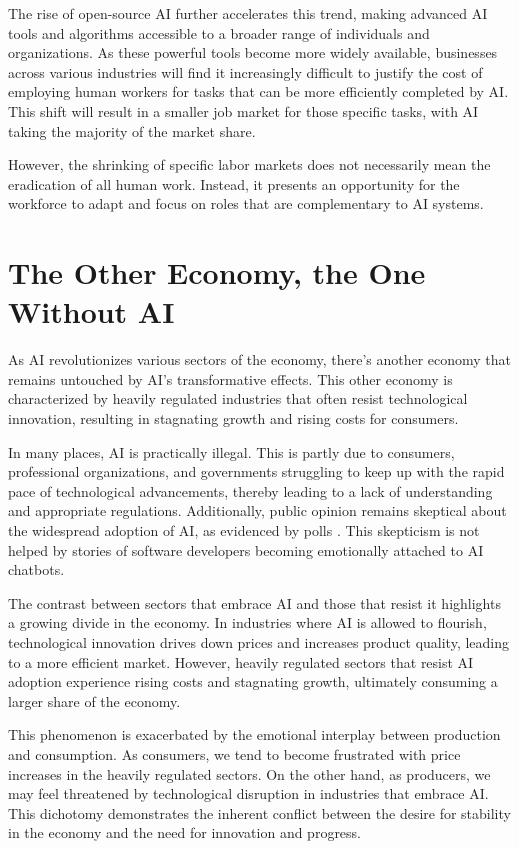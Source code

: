 The rise of open-source AI further accelerates this trend, making advanced AI tools and algorithms accessible to a broader range of individuals and organizations. As these powerful tools become more widely available, businesses across various industries will find it increasingly difficult to justify the cost of employing human workers for tasks that can be more efficiently completed by AI. This shift will result in a smaller job market for those specific tasks, with AI taking the majority of the market share.

However, the shrinking of specific labor markets does not necessarily mean the eradication of all human work. Instead, it presents an opportunity for the workforce to adapt and focus on roles that are complementary to AI systems.

\section{The Other Economy, the One Without AI}

As AI revolutionizes various sectors of the economy, there’s another economy that remains untouched by AI’s transformative effects. This other economy is characterized by heavily regulated industries that often resist technological innovation, resulting in stagnating growth and rising costs for consumers.

In many places, AI is practically illegal. This is partly due to consumers, professional organizations, and governments struggling to keep up with the rapid pace of technological advancements, thereby leading to a lack of understanding and appropriate regulations. Additionally, public opinion remains skeptical about the widespread adoption of AI, as evidenced by polls . This skepticism is not helped by stories of software developers becoming emotionally attached to AI chatbots.

The contrast between sectors that embrace AI and those that resist it highlights a growing divide in the economy. In industries where AI is allowed to flourish, technological innovation drives down prices and increases product quality, leading to a more efficient market. However, heavily regulated sectors that resist AI adoption experience rising costs and stagnating growth, ultimately consuming a larger share of the economy.

This phenomenon is exacerbated by the emotional interplay between production and consumption. As consumers, we tend to become frustrated with price increases in the heavily regulated sectors. On the other hand, as producers, we may feel threatened by technological disruption in industries that embrace AI. This dichotomy demonstrates the inherent conflict between the desire for stability in the economy and the need for innovation and progress.

